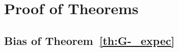 \documentclass[11pt]{article}
\newtheorem{lemma}{Lemma}
\theoremstyle{remark}
\begin{document}



\section{Proof of Theorems} \label{appendix:A}

\subsection{Bias of Theorem~\ref{th:G-_expec}} 
\label{appendix:bias}
\end{document}
